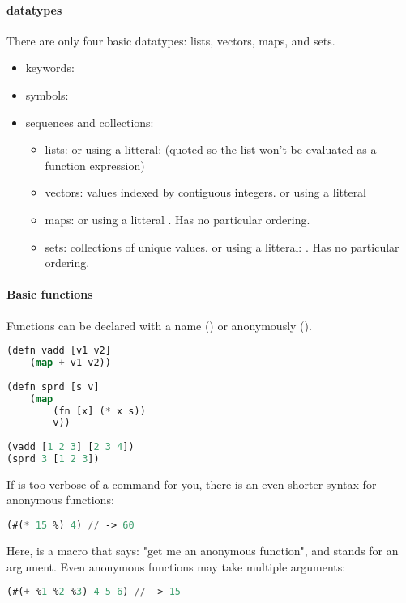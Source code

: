 \paragraph{datatypes}
There are only four basic datatypes: lists, vectors, maps, and sets.

\begin{itemize}
    \item keywords: 
    \item symbols: 
    \item sequences and collections: 
        \begin{itemize}
            \item lists:  or using a litteral:  (quoted so the list won't be evaluated as a function expression)
            \item vectors: values indexed by contiguous integers.  or using a litteral \inlinecode{[a b c d e f]}
            \item maps:  or using a litteral . Has no particular ordering.
            \item sets: collections of unique values.  or using a litteral: . Has no particular ordering. 
        \end{itemize}
\end{itemize}

\paragraph{Basic functions} Functions can be declared with a name () or anonymously (). 

\begin{lstlisting}[language=lisp]
(defn vadd [v1 v2]
    (map + v1 v2))
    
(defn sprd [s v]
    (map 
        (fn [x] (* x s)) 
        v))
    
(vadd [1 2 3] [2 3 4])
(sprd 3 [1 2 3])
\end{lstlisting}

If  is too verbose of a command for you, there is an even shorter syntax for anonymous functions: 
\begin{lstlisting}[language=lisp]
(#(* 15 %) 4) // -> 60
\end{lstlisting}
Here,  is a macro that says: "get me an anonymous function", and \inlinecode{\%} stands for an argument. Even anonymous functions may take multiple arguments:
\begin{lstlisting}[language=lisp]
(#(+ %1 %2 %3) 4 5 6) // -> 15
\end{lstlisting}


